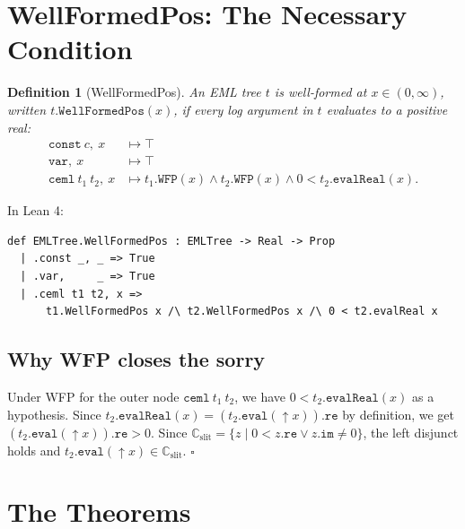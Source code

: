 \documentclass[12pt]{article}
\newtheorem{definition}[theorem]{Definition}
\begin{document}
\section{WellFormedPos: The Necessary Condition}

\begin{definition}[WellFormedPos]
An EML tree $t$ is \emph{well-formed at} $x \in (0,\infty)$, written
$t.\mathtt{WellFormedPos}(x)$, if every log argument in $t$ evaluates to a positive real:
\[
\begin{aligned}
  \mathtt{const}\ c,\ x &\mapsto \top \\
  \mathtt{var},\ x &\mapsto \top \\
  \mathtt{ceml}\ t_1\ t_2,\ x &\mapsto t_1.\mathtt{WFP}(x)
    \land t_2.\mathtt{WFP}(x)
    \land 0 < t_2.\mathtt{evalReal}(x).
\end{aligned}
\]
\end{definition}

In Lean 4:
\begin{lstlisting}
def EMLTree.WellFormedPos : EMLTree -> Real -> Prop
  | .const _, _ => True
  | .var,     _ => True
  | .ceml t1 t2, x =>
      t1.WellFormedPos x /\ t2.WellFormedPos x /\ 0 < t2.evalReal x
\end{lstlisting}

\subsection{Why WFP closes the sorry}

Under WFP for the outer node $\mathtt{ceml}\ t_1\ t_2$, we have
$0 < t_2.\mathtt{evalReal}(x)$ as a hypothesis. Since
$t_2.\mathtt{evalReal}(x) = (t_2.\mathtt{eval}(\uparrow\!x)).\mathtt{re}$
by definition, we get $(t_2.\mathtt{eval}(\uparrow\!x)).\mathtt{re} > 0$.
Since $\mathbb{C}_{\mathrm{slit}} = \{z \mid 0 < z.\mathtt{re} \lor z.\mathtt{im} \neq 0\}$,
the left disjunct holds and $t_2.\mathtt{eval}(\uparrow\!x) \in \mathbb{C}_{\mathrm{slit}}$. $\square$

\section{The Theorems}
\end{document}

